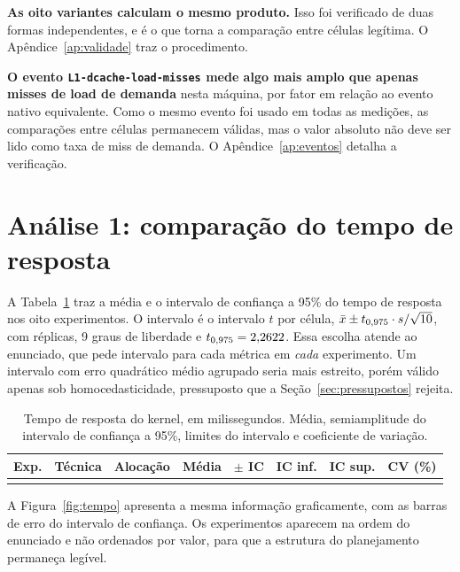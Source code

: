 \documentclass[11pt,a4paper]{article}
\begin{document}
\textbf{As oito variantes calculam o mesmo produto.} Isso foi verificado de duas formas
independentes, e é o que torna a comparação entre células legítima. O
Apêndice~\ref{ap:validade} traz o procedimento.

\textbf{O evento \texttt{L1-dcache-load-misses} mede algo mais amplo que apenas misses
de load de demanda} nesta máquina, por fator \valRazaoEvMisses{} em relação ao evento
nativo equivalente. Como o mesmo evento foi usado em todas as \valMedicoes{} medições, as
comparações entre células permanecem válidas, mas o valor absoluto não deve ser lido como
taxa de miss de demanda. O Apêndice~\ref{ap:eventos} detalha a verificação.

\section{Análise 1: comparação do tempo de resposta}
\label{sec:analise1}

A Tabela~\ref{tab:tempo} traz a média e o intervalo de confiança a 95\% do tempo de
resposta nos oito experimentos. O intervalo é o intervalo $t$ por célula,
$\bar{x} \pm t_{0{,}975} \cdot s/\sqrt{10}$, com \valReplicas{} réplicas,
9 graus de liberdade e $t_{0{,}975} = 2{,}2622$. Essa escolha atende ao enunciado, que pede intervalo para cada métrica
em \emph{cada} experimento. Um intervalo com erro quadrático médio agrupado seria mais
estreito, porém válido apenas sob homocedasticidade, pressuposto que a
Seção~\ref{sec:pressupostos} rejeita.

\begin{table}[H]
\centering
\caption{Tempo de resposta do kernel, em milissegundos. Média, semiamplitude do
intervalo de confiança a 95\%, limites do intervalo e coeficiente de variação.}
\label{tab:tempo}
\small
\begin{tabular}{@{}cllrrrrr@{}}
\toprule
\textbf{Exp.} & \textbf{Técnica} & \textbf{Alocação} & \textbf{Média} &
\textbf{$\pm$ IC} & \textbf{IC inf.} & \textbf{IC sup.} & \textbf{CV (\%)} \\
\midrule
\\
\bottomrule
\end{tabular}
\end{table}

A Figura~\ref{fig:tempo} apresenta a mesma informação graficamente, com as barras de erro
do intervalo de confiança. Os experimentos aparecem na ordem do enunciado e não ordenados
por valor, para que a estrutura do planejamento permaneça legível.
\end{document}

